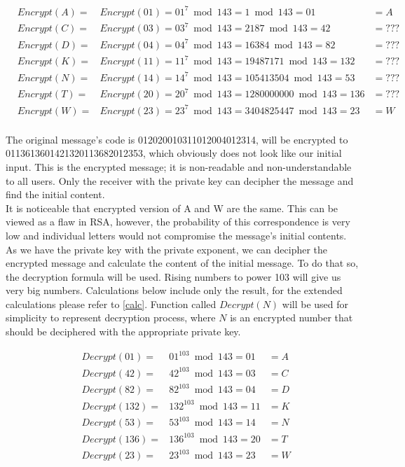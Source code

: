 \documentclass[a4paper, 12pt]{article}
\begin{document}
\begin{align*}
  &Encrypt(A)=&Encrypt(01)=01^7 \bmod 143=1 \bmod 143=01&=A\\
  &Encrypt(C)=&Encrypt(03)=03^7 \bmod 143=2187 \bmod 143=42&=???\\
  &Encrypt(D)=&Encrypt(04)=04^7 \bmod 143=16384 \bmod 143=82&=???\\
  &Encrypt(K)=&Encrypt(11)=11^7 \bmod 143=19487171 \bmod 143=132&=???\\
  &Encrypt(N)=&Encrypt(14)=14^7 \bmod 143=105413504 \bmod 143=53&=???\\
  &Encrypt(T)=&Encrypt(20)=20^7 \bmod 143=1280000000 \bmod 143=136&=???\\
  &Encrypt(W)=&Encrypt(23)=23^7 \bmod 143=3404825447 \bmod 143=23&=W\\
\end{align*}

The original message's code is 012020010311012004012314, will be encrypted to
0113613601421320113682012353, which obviously does not look like our initial input. This is
the encrypted message; it is non-readable and non-understandable to all users. Only the receiver
with the private key can decipher the message and find the initial content.\\

It is noticeable that encrypted version of A and W are the same. This can be viewed as a flaw in RSA, however,
the probability of this correspondence is very low and individual letters would not compromise the message's
initial contents.\\

As we have the private key with the private exponent, we can decipher the encrypted message and
calculate the content of the initial message. To do that so, the decryption formula will be used. Rising
numbers to power 103 will give us very big numbers. Calculations below include only the result,
for the extended calculations please refer to \ref{calc}. Function called $Decrypt(N)$ will be used
for simplicity to represent decryption process, where $N$ is an encrypted number that should be
deciphered with the appropriate private key.

\begin{align*}
  &Decrypt(01)=&01^{103} \bmod 143=01&=A\\
  &Decrypt(42)=&42^{103} \bmod 143=03&=C\\
  &Decrypt(82)=&82^{103} \bmod 143=04&=D\\
  &Decrypt(132)=&132^{103} \bmod 143=11&=K\\
  &Decrypt(53)=&53^{103} \bmod 143=14&=N\\
  &Decrypt(136)=&136^{103} \bmod 143=20&=T\\
  &Decrypt(23)=&23^{103} \bmod 143=23&=W\\
\end{align*}
\end{document}
